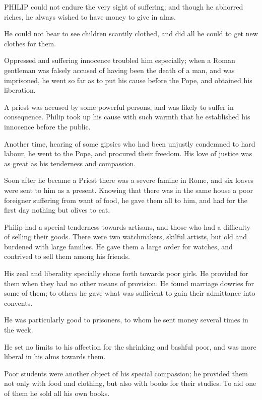 

PHILIP could not
endure the very sight of suffering; and though he abhorred riches, he
always wished to have money to give in alms.

He could not bear to see
children scantily clothed, and did all he could to get new clothes for
them.

Oppressed and suffering
innocence troubled him especially; when a Roman gentleman was falsely
accused of having been the death of a man, and was imprisoned, he went
so far as to put his cause before the Pope, and obtained his liberation.

A priest was accused by some
powerful persons, and was likely to suffer in consequence. Philip took
up his cause with such warmth that he established his innocence before
the public.

Another time, hearing of some
gipsies who had been unjustly condemned to hard labour, he went to the
Pope, and procured their freedom. His love of justice was as great as
his tenderness and compassion.

Soon after he became a Priest
there was a severe famine in Rome, and six loaves were sent to him as
a present. Knowing that there was in the same house a poor
foreigner suffering from want of food, he gave them all to him, and had
for the first day nothing but olives to eat.

Philip had a special tenderness
towards artisans, and those who had a difficulty of selling their goods.
There were two watchmakers, skilful artists, but old and burdened with
large families. He gave them a large order for watches, and contrived to
sell them among his friends.

His zeal and liberality
specially shone forth towards poor girls. He provided for them when they
had no other means of provision. He found marriage dowries for some of
them; to others he gave what was sufficient to gain their admittance
into convents.

He was particularly good to
prisoners, to whom he sent money several times in the week.

He set no limits to his
affection for the shrinking and bashful poor, and was more liberal in
his alms towards them.

Poor students were another
object of his special compassion; he provided them not only with food
and clothing, but also with books for their studies. To aid one of them
he sold all his own books.

